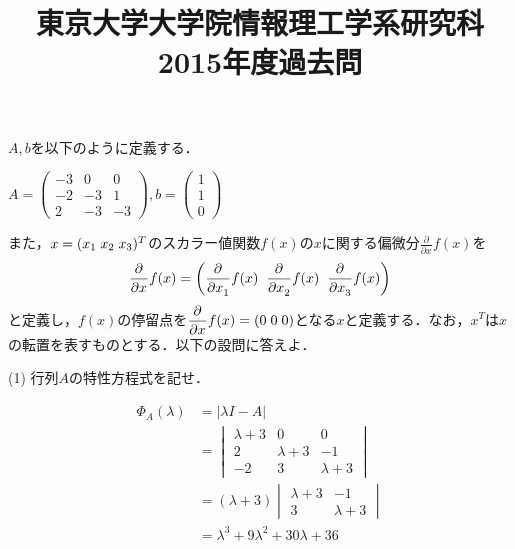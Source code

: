 \documentclass[a4j]{jarticle}
\title{東京大学大学院情報理工学系研究科2015年度過去問}
\author{}
\date{}
\let \ds \displaystyle
\newcommand{\pdiff}[3]{
  \frac{\partial^{#1} #2}{\partial #3^{#1}}
}
\begin{document}
\thispagestyle{empty}
\maketitle
\pagebreak

\section{}

\begin{screen}
 $A,b$を以下のように定義する．
 
 $\ds A=\left(
 \begin{array}{rrr}
      -3 & 0 & 0 \\
      -2 & -3 & 1 \\
      2 & -3 & -3
 \end{array}\right),
 b=\left(\begin{array}{c}1 \\ 1 \\ 0\end{array}\right)$

 また，$x=(x_1 \hspace{1mm} x_2 \hspace{1mm} x_3)^T$のスカラー値関数$f(x)$の$x$に関する偏微分$\ds \pdiff{}{}{x}f(x)$を
 $$\pdiff{}{}{x}f(x) = \left(\pdiff{}{}{x_1}f(x)\hspace{2mm}\pdiff{}{}{x_2}f(x)\hspace{2mm}\pdiff{}{}{x_3}f(x)\right)$$
 と定義し，$f(x)$の停留点を$\ds \pdiff{}{}{x}f(x)=(0 \hspace{1mm} 0 \hspace{1mm} 0)$となる$x$と定義する．なお，$x^T$は$x$の転置を表すものとする．以下の設問に答えよ．
\end{screen}

\begin{screen}
 (1) 行列$A$の特性方程式を記せ．
\end{screen}

\begin{align*}
 \ds \Phi_A(\lambda) &= |\lambda I - A| \\
 &=
 \begin{vmatrix}
 \lambda + 3 & 0 & 0 \\
 2 & \lambda +3 & -1 \\
 -2 & 3 & \lambda + 3
 \end{vmatrix} \\&= (\lambda+3)
 \begin{vmatrix}
 \lambda + 3 & -1 \\
 3 & \lambda+3
 \end{vmatrix} \\&= \lambda^3+9\lambda^2+30\lambda+36
\end{align*}
\end{document}
